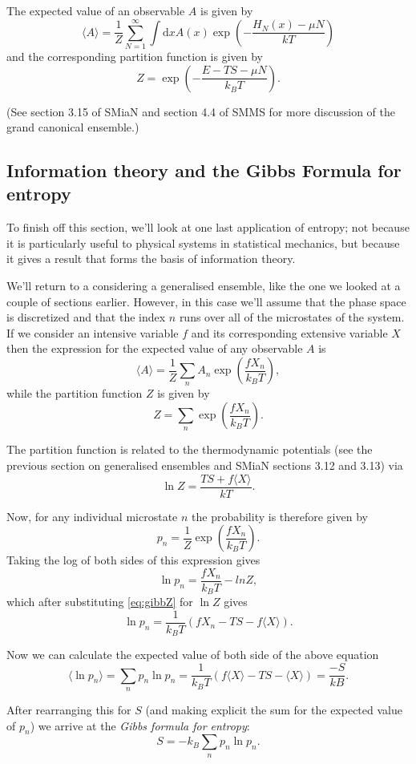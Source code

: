 The expected value of an observable $A$ is given by
$$
	\langle A\rangle = \frac{1}{Z}\sum_{N=1}^{\infty}\int\mathrm{d}xA(x)\exp\left(-\frac{H_N(x)-\mu N}{k T}\right)
$$
and the corresponding partition function is given by
$$
	Z=\exp\left(-\frac{E-TS-\mu N}{k_B T}\right).
$$

(See section 3.15 of SMiaN and section 4.4 of SMMS for more discussion of the grand canonical ensemble.)

\subsection{Information theory and the Gibbs Formula for entropy}
To finish off this section, we'll look at one last application of entropy; not because it is particularly useful to physical systems in statistical mechanics, but because it gives a result that forms the basis of information theory.

We'll return to a considering a generalised ensemble, like the one we looked at a couple of sections earlier. However, in this case we'll assume that the phase space is discretized and that the index $n$ runs over all of the microstates of the system. If we consider an intensive variable $f$ and its corresponding extensive variable $X$ then the expression for the expected value of any observable $A$ is
$$
	\langle A \rangle = \frac{1}{Z}\sum_n A_n\exp\left(\frac{fX_n}{k_BT}\right),
$$
while the partition function $Z$ is given by
$$
	Z =\sum_n\exp\left(\frac{fX_n}{k_BT}\right).
$$

The partition function is related to the thermodynamic potentials (see the previous section on generalised ensembles and SMiaN sections 3.12 and 3.13) via
\begin{equation}
	\ln Z = \frac{TS+f\langle X\rangle}{kT}.
	\label{eq:gibbZ}
\end{equation}

Now, for any individual microstate $n$ the probability is therefore given by
$$
	p_n = \frac{1}{Z}\exp\left(\frac{fX_n}{k_BT}\right).
$$
Taking the log of both sides of this expression gives
$$
	\ln p_n = \frac{fX_n}{k_BT} - ln Z,
$$
which after substituting \ref{eq:gibbZ} for $\ln Z$ gives
$$
	\ln p_n = \frac{1}{k_BT}(fX_n -TS -f\langle X\rangle).
$$

Now we can calculate the expected value of both side of the above equation
$$
	\langle \ln p_n \rangle = \sum_n p_n\ln p_n = \frac{1}{k_BT}(f\langle X\rangle -TS -\langle X \rangle) = \frac{-S}{kB}.
$$


After rearranging this for $S$ (and making explicit the sum for the expected value of $p_n$) we arrive at the \emph{Gibbs formula for entropy}:
$$
	S = -k_B\sum_np_n\ln p_n.
$$

